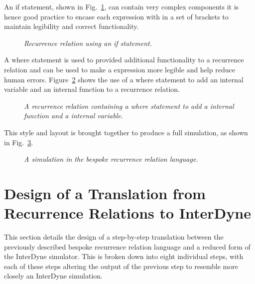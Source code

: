 \documentclass{article}
\begin{document}
An if statement, shown in Fig.~\ref{fig:6exofla}, can contain very complex components it is hence good practice to encase each expression with in a set of brackets to maintain legibility and correct functionality.  
\begin{figure}[H]
	\centering
	
	\caption{\it Recurrence relation using an if statement.}
	\label{fig:6exofla}
\end{figure} 
 
A where statement is used to provided additional functionality to a recurrence relation and can be used to make a expression more legible and help reduce human errors. Figure~\ref{fig:7exofla} shows the use of a where statement to add an internal variable and an internal function to a recurrence relation. 
\begin{figure}[H]
	\centering
	
	\caption{\it A recurrence relation containing a where statement to add a internal function and a internal variable.  }
	\label{fig:7exofla}
\end{figure} 

This style and layout is brought together to produce a full simulation, as shown in Fig.~\ref{fig:8exofla}.
\begin{figure}[H]
	\centering
	
	\caption{\it A simulation in the bespoke recurrence relation language.}
	\label{fig:8exofla}
\end{figure} 






\newpage
\section{Design of a Translation from Recurrence Relations to InterDyne} 
This section details the design of a step-by-step translation between the previously described bespoke recurrence relation language and a reduced form of the InterDyne simulator. This is broken down into eight individual steps, with each of these steps altering the output of the previous step to resemble more closely an InterDyne simulation.
\end{document}
